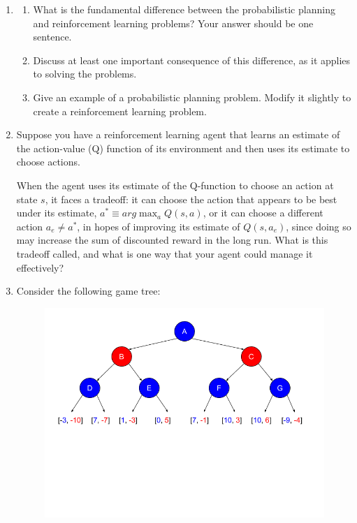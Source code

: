 \documentclass[12pt]{article}
\begin{document}
\begin{enumerate}
    \item 
    \begin{enumerate}
        \item What is the fundamental difference between the probabilistic planning and reinforcement learning problems? Your answer should be one sentence.
        
        \item Discuss at least one important consequence of this difference, as it applies to solving the problems.
        
        \item Give an example of a probabilistic planning problem. Modify it slightly to create a reinforcement learning problem.
        
    \end{enumerate}
    
    \item Suppose you have a reinforcement learning agent that learns an estimate of the action-value (Q) function of its environment and then uses its estimate to choose actions. 
    
    When the agent uses its estimate of the Q-function to choose an action at state $s$, it faces a tradeoff: it can choose the action that appears to be best under its estimate, $a^* \equiv arg\max_a {Q(s, a)}$, or it can choose a different action $a_e \neq a^*$, in hopes of improving its estimate of $Q(s, a_e)$, since doing so may increase the sum of discounted reward in the long run. What is this tradeoff called, and what is one way that your agent could manage it effectively? 
    
    
    \item Consider the following game tree:
    \begin{figure}[h]
    \includegraphics[scale = 0.5]{rl-game-tree.png}
    \centering
    \end{figure}
    

\end{enumerate}
\end{document}
